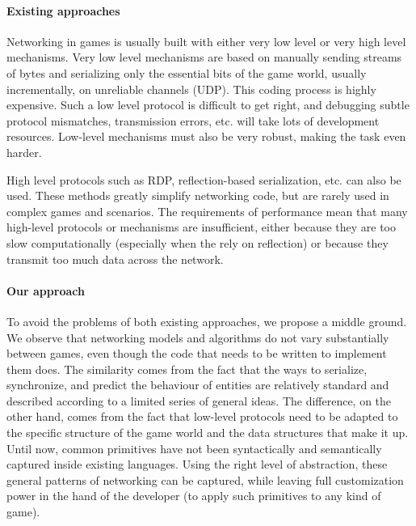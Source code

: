 \paragraph{Existing approaches}
Networking in games is usually built with either very low level or very high level mechanisms. Very low level mechanisms are based on manually sending streams of bytes and serializing only the essential bits of the game world, usually incrementally, on unreliable channels (UDP). This coding process is highly expensive. Such a low level protocol is difficult to get right, and debugging subtle protocol mismatches, transmission errors, etc. will take lots of development resources. Low-level mechanisms must also be very robust, making the task even harder.

High level protocols such as RDP, reflection-based serialization, etc. can also be used. These methods greatly simplify  networking code, but are rarely used in complex games and scenarios. The requirements of performance mean that many high-level protocols or mechanisms are insufficient, either because they are too slow computationally (especially when the rely on reflection) or because they transmit too much data across the network.

\paragraph{Our approach}
To avoid the problems of both existing approaches, we propose a middle ground. We observe that networking models and algorithms do not vary substantially between games, even though the code that needs to be written to implement them does. The similarity comes from the fact that the ways to serialize, synchronize, and predict the behaviour of entities are relatively standard and described according to a limited series of general ideas. The difference, on the other hand, comes from the fact that low-level protocols need to be adapted to the specific structure of the game world and the data structures that make it up. Until now, common primitives have not been syntactically and semantically captured inside existing languages. Using the right level of abstraction, these general patterns of networking can be captured, while leaving full customization power in the hand of the developer (to apply such primitives to any kind of game).

